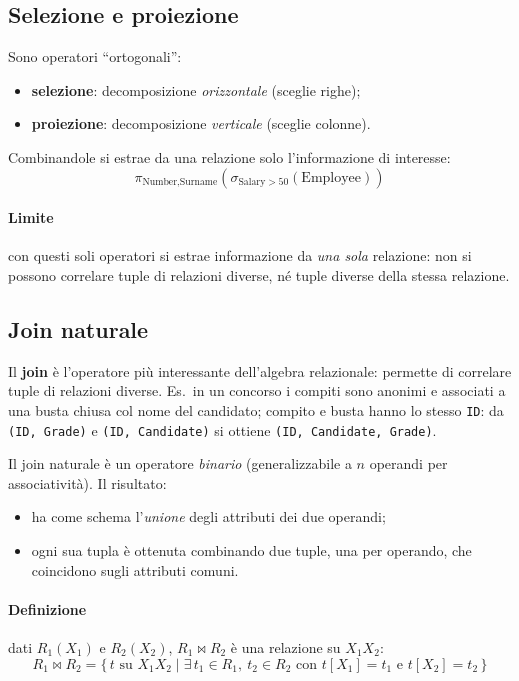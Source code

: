 \documentclass[a4paper,12pt]{article}
\begin{document}
\subsection{Selezione e proiezione}

Sono operatori ``ortogonali'':
\begin{itemize}
  \item \textbf{selezione}: decomposizione \emph{orizzontale} (sceglie righe);
  \item \textbf{proiezione}: decomposizione \emph{verticale} (sceglie colonne).
\end{itemize}
Combinandole si estrae da una relazione solo l'informazione di interesse:
\[
  \pi_{\text{Number},\text{Surname}}
    (\sigma_{\text{Salary} > 50}(\text{Employee}))
\]

\paragraph{Limite} con questi soli operatori si estrae informazione da
\emph{una sola} relazione: non si possono correlare tuple di relazioni diverse,
né tuple diverse della stessa relazione.

\subsection{Join naturale}

Il \textbf{join} è l'operatore più interessante dell'algebra relazionale:
permette di correlare tuple di relazioni diverse. Es.\ in un concorso i compiti
sono anonimi e associati a una busta chiusa col nome del candidato; compito e
busta hanno lo stesso \texttt{ID}: da \texttt{(ID, Grade)} e
\texttt{(ID, Candidate)} si ottiene \texttt{(ID, Candidate, Grade)}.

Il join naturale è un operatore \emph{binario} (generalizzabile a $n$ operandi
per associatività). Il risultato:
\begin{itemize}
  \item ha come schema l'\emph{unione} degli attributi dei due operandi;
  \item ogni sua tupla è ottenuta combinando due tuple, una per operando, che
    coincidono sugli attributi comuni.
\end{itemize}

\paragraph{Definizione} dati $R_1(X_1)$ e $R_2(X_2)$, $R_1 \bowtie R_2$ è una
relazione su $X_1 X_2$:
\[
  R_1 \bowtie R_2 = \{\, t \text{ su } X_1X_2 \mid
    \exists\, t_1 \in R_1,\ t_2 \in R_2 \text{ con }
    t[X_1] = t_1 \text{ e } t[X_2] = t_2 \,\}
\]
\end{document}
